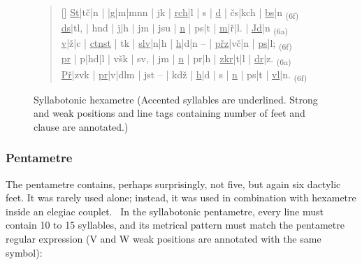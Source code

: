 \begin{figure}[htpb]
    \centering
    \begin{verse}[\versewidth]
    \uline{St}|tč|n | \uline{}|g|m|mnn | jk | \uline{rch}|l | s | \uline{d} | čs|kch | \uline{bs}|n \textsubscript{(6f)}\\
    \uline{ds}|tl, | hnd | \uline{j}|h | jm | jsu | \uline{n} | ps|t | \uline{m}|ř|l. | \uline{Jd}|n \textsubscript{(6a)}\\
    \uline{v}|ž|c | \uline{ctnst} | tk | \uline{slv}|n|h | \uline{h}|d|n – | \uline{přz}|vč|n | \uline{ps}|l; \textsubscript{(6f)}\\
    \uline{pr} | p|hd|l | všk | sv, | jm | \uline{n} | pr|h | \uline{zkr}|t|l | \uline{dr}|z. \textsubscript{(6a)}\\
    \uline{Př}|zvk | \uline{pr}|v|dlm | jst – | kdž | \uline{h}|d | s | \uline{n} | ps|t | \uline{vl}|n. \textsubscript{(6f)}\\
    \end{verse}
    \caption[Syllabotonic hexametre]{Syllabotonic hexametre (Accented syllables are underlined. Strong and weak positions and line tags containing number of feet and clause are annotated.)}\label{fig:syllabotonic-hexametre}
\end{figure}

\subsubsection{Pentametre}
The pentametre contains, perhaps surprisingly, not five, but again six dactylic feet. It was rarely used alone; instead, it was used in combination with hexametre inside an elegiac couplet.~\cite{UvodTeorieVerse} In the syllabotonic pentametre, every line must contain 10 to 15 syllables, and its metrical pattern must match the pentametre regular expression (V and W weak positions are annotated with the same symbol):

